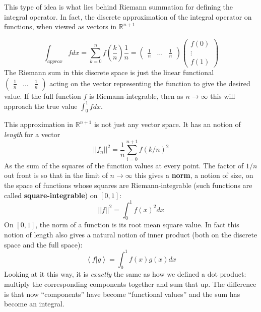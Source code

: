 	This type of idea is what lies behind Riemann summation for defining the integral operator. In fact, the discrete approximation of the integral operator on functions, when viewed as vectors in $\mathbb{R}^{n+1}$
	\begin{example}
	\end{example}
	\begin{equation*}
		\int_{approx} f dx = \sum_{k=0}^n f\left(\frac{k}{n}\right) \frac{1}{n} = 
		\begin{pmatrix}
			\frac{1}{n} & \dots & \frac{1}{n}
		\end{pmatrix}
		\begin{pmatrix}
			f(0) \\
			\vdots \\
			f(1)
		\end{pmatrix}
	\end{equation*}
	The Riemann sum in this discrete space is just the linear functional $\begin{pmatrix}
			\frac{1}{n} & \dots & \frac{1}{n}
		\end{pmatrix}$ acting on the vector representing the function to give the desired value. If the full function $f$ is Riemann-integrable, then as $n\rightarrow \infty$  this will approach the true value $\int_0^1 f dx$. 
		
	This approximation in $\mathbb R^{n+1}$ is not just any vector space. It has an notion of \emph{length} for a vector
	\begin{equation}
		||f_n||^2 = \frac{1}{n} \sum_{i=0}^{n+1} f(k/n)^2 
	\end{equation}
	As the sum of the squares of the function values at every point. The factor of $1/n$ out front is so that in the limit of $n\rightarrow \infty$ this gives a \textbf{norm}, a notion of size, on the space of functions whose squares are Riemann-integrable (such functions are called \textbf{square-integrable}) on $[0,1]$: 
	\begin{equation}
		||f||^2 = \int_{0}^1 f(x)^2 dx
	\end{equation}
	On $[0,1]$, the norm of a function is its root mean square value. In fact this notion of length also gives a natural notion of inner product (both on the discrete space and the full space):
	\begin{equation}
		\left< f | g \right> = \int_{0}^1 f(x) g(x) dx
	\end{equation}
	Looking at it this way, it is \emph{exactly} the same as how we defined a dot product: multiply the corresponding components together and sum that up. The difference is that now ``components'' have become ``functional values'' and the sum has become an integral.
	

